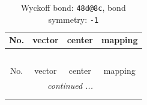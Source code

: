 \documentclass[fleqn,8pt]{jsarticle}
\begin{document}
\renewcommand{\arraystretch}{1.2}
\begin{longtable}{cccc}
\caption{Wyckoff bond: {\tt 48d@8c}, bond symmetry: {\tt -1}}
 \\
 \hline \hline
No. & vector & center & mapping \\ \hline \endfirsthead

\multicolumn{3}{l}{\tablename\ \thetable{}} \\
 \hline \hline
No. & vector & center & mapping \\ \hline \endhead

 \hline \hline
\multicolumn{3}{r}{\footnotesize\it continued ...} \\ \endfoot

 \hline \hline
\multicolumn{3}{r}{} \\ \endlastfoot


\end{longtable}
\end{document}
